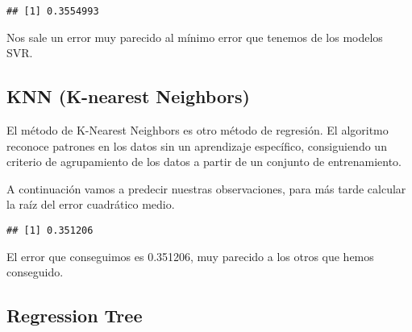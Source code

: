 \documentclass[
]{article}
\newenvironment{Shaded}{\begin{snugshade}}{\end{snugshade}}
\newcommand{\DataTypeTok}[1]{\textcolor[rgb]{0.13,0.29,0.53}{#1}}
\newcommand{\DecValTok}[1]{\textcolor[rgb]{0.00,0.00,0.81}{#1}}
\newcommand{\KeywordTok}[1]{\textcolor[rgb]{0.13,0.29,0.53}{\textbf{#1}}}
\newcommand{\NormalTok}[1]{#1}
\newcommand{\OperatorTok}[1]{\textcolor[rgb]{0.81,0.36,0.00}{\textbf{#1}}}
\newcommand{\StringTok}[1]{\textcolor[rgb]{0.31,0.60,0.02}{#1}}
\begin{document}
\begin{verbatim}
## [1] 0.3554993
\end{verbatim}

Nos sale un error muy parecido al mínimo error que tenemos de los
modelos SVR.

\hypertarget{knn-k-nearest-neighbors}{%
\subsection{KNN (K-nearest Neighbors)}\label{knn-k-nearest-neighbors}}

El método de K-Nearest Neighbors es otro método de regresión. El
algoritmo reconoce patrones en los datos sin un aprendizaje específico,
consiguiendo un criterio de agrupamiento de los datos a partir de un
conjunto de entrenamiento.

A continuación vamos a predecir nuestras observaciones, para más tarde
calcular la raíz del error cuadrático medio.

\begin{Shaded}
\end{Shaded}

\begin{verbatim}
## [1] 0.351206
\end{verbatim}

El error que conseguimos es 0.351206, muy parecido a los otros que hemos
conseguido.

\hypertarget{regression-tree}{%
\subsection{Regression Tree}\label{regression-tree}}
\end{document}
